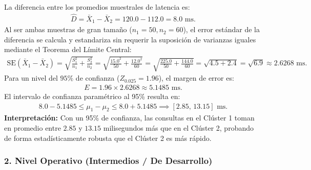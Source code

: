 \begin{solproblema}
	La diferencia entre los promedios muestrales de latencia es:
	\begin{align}
		\hat{D} = \bar{X}_1 - \bar{X}_2 = 120.0 - 112.0 = 8.0 \text{ ms.}
	\end{align}
	Al ser ambas muestras de gran tamaño ($n_1 = 50, n_2 = 60$), el error estándar de la diferencia se calcula y estandariza sin requerir la suposición de varianzas iguales mediante el Teorema del Límite Central:
	\begin{align}
		\text{SE}(\bar{X}_1 - \bar{X}_2) = \sqrt{\frac{S_1^2}{n_1} + \frac{S_2^2}{n_2}} = \sqrt{\frac{15.0^2}{50} + \frac{12.0^2}{60}} = \sqrt{\frac{225.0}{50} + \frac{144.0}{60}} = \sqrt{4.5 + 2.4} = \sqrt{6.9} \approx 2.6268 \text{ ms.}
	\end{align}
	Para un nivel del $95\%$ de confianza ($Z_{0.025} = 1.96$), el margen de error es:
	\begin{align}
		E = 1.96 \times 2.6268 \approx 5.1485 \text{ ms.}
	\end{align}
	El intervalo de confianza paramétrico al 95\% resulta en:
	\begin{align}
		8.0 - 5.1485 \le \mu_1 - \mu_2 \le 8.0 + 5.1485 \implies [2.85, \, 13.15] \text{ ms.}
	\end{align}
	\textbf{Interpretación:} Con un 95\% de confianza, las consultas en el Clúster 1 toman en promedio entre $2.85$ y $13.15$ milisegundos más que en el Clúster 2, probando de forma estadísticamente robusta que el Clúster 2 es más rápido.
\end{solproblema}

\subsubsection*{2. Nivel Operativo (Intermedios / De Desarrollo)}

